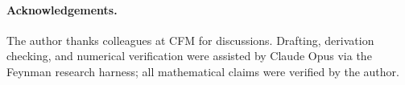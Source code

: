 \documentclass[11pt]{article}
\theoremstyle{plain}
\begin{document}
\paragraph{Acknowledgements.} The author thanks colleagues at CFM for discussions. Drafting, derivation checking, and numerical verification were assisted by Claude Opus via the Feynman research harness; all mathematical claims were verified by the author.



\end{document}
